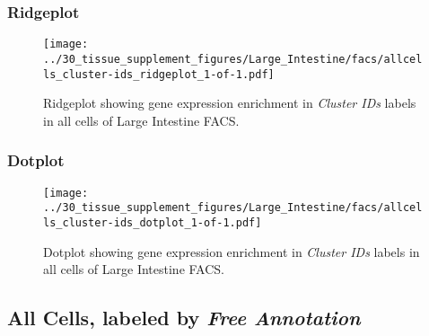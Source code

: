 \clearpage

\subsubsection{Ridgeplot}
\begin{figure}[h]
\centering
\texttt{[image: ../30\_tissue\_supplement\_figures/Large\_Intestine/facs/allcells\_cluster-ids\_ridgeplot\_1-of-1.pdf]}

\caption{ Ridgeplot  showing gene expression enrichment in \emph{Cluster IDs} labels in all cells of Large Intestine FACS. }
\end{figure}


\clearpage

\subsubsection{Dotplot}
\begin{figure}[h]
\centering
\texttt{[image: ../30\_tissue\_supplement\_figures/Large\_Intestine/facs/allcells\_cluster-ids\_dotplot\_1-of-1.pdf]}

\caption{ Dotplot  showing gene expression enrichment in \emph{Cluster IDs} labels in all cells of Large Intestine FACS. }
\end{figure}


\clearpage

\subsection{All Cells, labeled by \emph{Free Annotation}}
